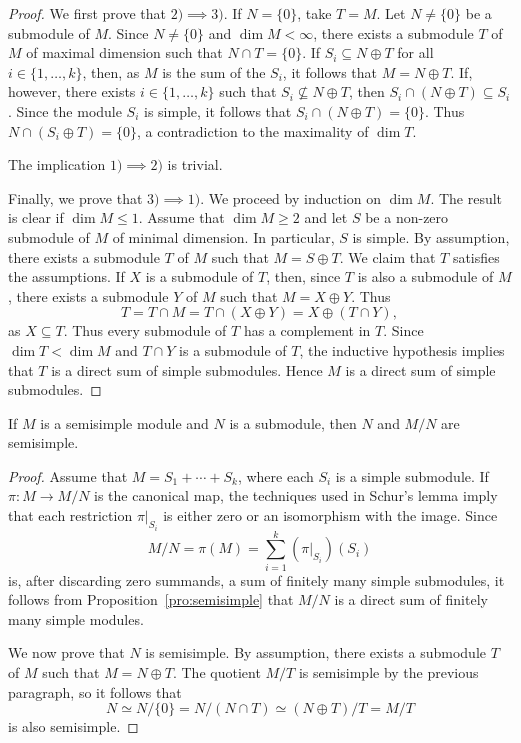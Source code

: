 \begin{proof}
  We first prove that $2)\implies3)$. If $N=\{0\}$, take $T=M$. 
	Let $N\ne\{0\}$ be a submodule of $M$. Since $N\ne\{0\}$ and $\dim M<\infty$, there exists a submodule 
	$T$ of $M$ of maximal dimension such that 
	$N\cap T=\{0\}$. If $S_i\subseteq N\oplus T$ for all $i\in\{1,\dots,k\}$, then, as $M$ is the sum of the $S_i$, it follows that
	$M=N\oplus T$. 
	If, however, there exists $i\in\{1,\dots,k\}$ such that $S_i\not\subseteq N\oplus T$, then $S_i\cap (N\oplus T)\subseteq S_i$. 
	Since the module $S_i$ is simple,
	it follows that $S_i\cap (N\oplus T)=\{0\}$. Thus $N\cap (S_i\oplus T)=\{0\}$, a contradiction to the maximality of
	$\dim T$.  
	
	The implication  $1)\implies2)$ is trivial. 
	
  Finally, we prove that $3)\implies1)$.  We proceed by induction on $\dim M$.
  The result is clear if $\dim M\leq1$. Assume that $\dim M\geq2$ and let $S$
  be a non-zero submodule of $M$ of minimal dimension. In particular, $S$ is
  simple.  By assumption, there exists a submodule $T$ of $M$ such that
  $M=S\oplus T$. We claim that $T$ satisfies the assumptions.  If $X$ is a
  submodule of $T$, then, since $T$ is also a submodule of $M$, there exists a
  submodule $Y$ of $M$ such that $M=X\oplus Y$. Thus  
	\[
	T=T\cap M=T\cap (X\oplus Y)=X\oplus (T\cap Y),
	\]
  as $X\subseteq T$. Thus every submodule of $T$ has a complement in $T$. 
  Since $\dim T<\dim M$ and $T\cap Y$ is a submodule of
  $T$, the inductive hypothesis implies that $T$ is a direct sum of simple
  submodules. Hence $M$ is a direct sum of simple submodules. 
\end{proof}

\begin{proposition}
    If $M$ is a semisimple module and $N$ is a submodule, then $N$ and $M/N$
    are semisimple.	
\end{proposition}

\begin{proof}
  Assume that $M=S_1+\cdots+ S_k$, where each $S_i$ is a simple submodule. If
  $\pi\colon M\to M/N$ is the canonical map, the techniques used in Schur's
  lemma imply that each restriction $\pi|_{S_i}$ is either zero or an
  isomorphism with the image. Since  
	\[
	M/N=\pi(M)=\sum_{i=1}^k(\pi|_{S_i})(S_i)
	\]
  is, after discarding zero summands, a sum of finitely many simple submodules,
  it follows from 
  Proposition~\ref{pro:semisimple} 
  that $M/N$ is a direct sum of finitely many simple modules.  
	
	We now prove that $N$ is semisimple. By assumption, 
	there exists a submodule $T$ of $M$ such that 
	$M=N\oplus T$. The quotient
	$M/T$ is semisimple by the previous paragraph, so it follows that 
	\[
	N\simeq N/\{0\}=N/(N\cap T)\simeq (N\oplus T)/T=M/T
	\]
	is also semisimple.     
\end{proof}

